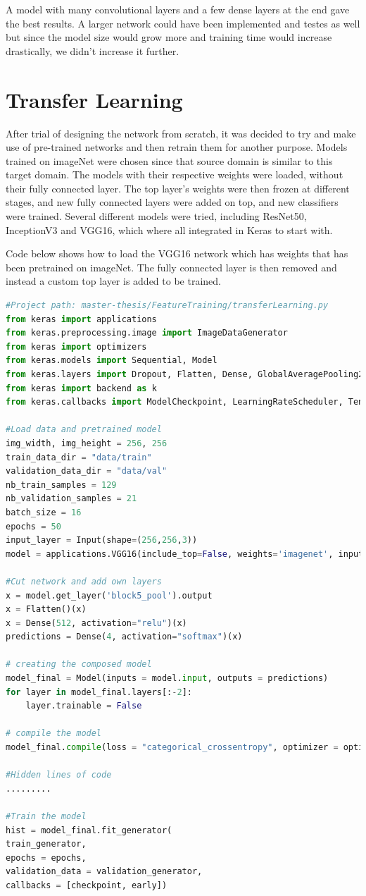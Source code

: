A model with many convolutional layers and a few dense layers at the end gave the best
results. A larger network could have been implemented and testes as well but
since the model size would grow more and training time would increase drastically,
we didn't increase it further.

\section{Transfer Learning}
After trial of designing the network from scratch, it was decided to try and make use of 
pre-trained networks and then retrain them for another purpose. Models trained on 
imageNet \cite{imageNet} were chosen since that source domain is similar to this target 
domain. The models with their respective weights were loaded, without their fully 
connected layer. The top layer's weights were then frozen at different stages, and new 
fully connected layers were added on top, and new classifiers were trained. 
Several different models were tried, including ResNet50, InceptionV3 and VGG16, 
which where all integrated in Keras to start with.

Code below shows how to load the VGG16 network which has weights that has been pretrained on imageNet. The fully connected layer is then removed and instead a custom top layer is added to be trained. 
\begin{lstlisting}[language=python]
#Project path: master-thesis/FeatureTraining/transferLearning.py
from keras import applications
from keras.preprocessing.image import ImageDataGenerator
from keras import optimizers
from keras.models import Sequential, Model
from keras.layers import Dropout, Flatten, Dense, GlobalAveragePooling2D, Input, Conv2D, MaxPool2D
from keras import backend as k
from keras.callbacks import ModelCheckpoint, LearningRateScheduler, TensorBoard, EarlyStopping

#Load data and pretrained model
img_width, img_height = 256, 256
train_data_dir = "data/train"
validation_data_dir = "data/val"
nb_train_samples = 129
nb_validation_samples = 21
batch_size = 16
epochs = 50
input_layer = Input(shape=(256,256,3))
model = applications.VGG16(include_top=False, weights='imagenet', input_tensor=input_layer, pooling=None)

#Cut network and add own layers
x = model.get_layer('block5_pool').output
x = Flatten()(x)
x = Dense(512, activation="relu")(x)
predictions = Dense(4, activation="softmax")(x)

# creating the composed model
model_final = Model(inputs = model.input, outputs = predictions)
for layer in model_final.layers[:-2]:
    layer.trainable = False
    
# compile the model
model_final.compile(loss = "categorical_crossentropy", optimizer = optimizers.SGD(lr = 0.0001, momentum = 0.9), metrics=["accuracy"])

#Hidden lines of code
.........

#Train the model
hist = model_final.fit_generator(
train_generator,
epochs = epochs,
validation_data = validation_generator,
callbacks = [checkpoint, early])
\end{lstlisting}


